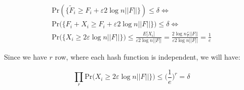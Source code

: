 \documentclass{article}
\begin{document}
\begin{gather*}
    \textrm{Pr}(\{\tilde{F}_{i} \ge F_{i} + \varepsilon 2 \log n ||F||\}) \le \delta \iff \\
    \textrm{Pr}\bigg(\bigg\{F_{i} + X_{i} \ge F_{i} + \varepsilon 2 \log n ||F|| \bigg\}\bigg) \le \delta \iff \\
    \textrm{Pr}\bigg(\bigg\{X_i \ge 2 \varepsilon \log n ||F||\bigg\}\bigg) \le \frac{E\big[ X_i \big]}{\varepsilon 2 \log n ||F||} = \frac{2\log n \frac{\varepsilon}{e} ||F||}{\varepsilon 2 \log n ||F||} = \frac{1}{e}
\end{gather*}

\noindent Since we have $r$ row, where each hash function is independent, we will have:

\begin{equation*}
    \prod_{r} \textrm{Pr}\bigg(X_{i} \ge 2 \varepsilon \log n ||F||\bigg\}\bigg) \le \bigg(\frac{1}{e}\bigg)^r = \delta
\end{equation*}
\end{document}
